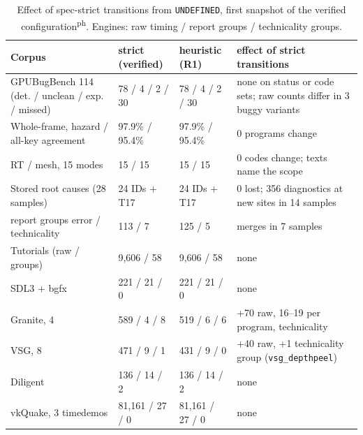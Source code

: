 \documentclass[acmtog,anonymous,review]{acmart}
\newcommand{\bench}{GPUBugBench\xspace}
\newcommand{\code}[1]{\texttt{#1}}
\newcommand{\posthoc}{\textsuperscript{\textsf{ph}}}
\begin{document}
\begin{table}[t]
\caption{Effect of spec-strict transitions from \code{UNDEFINED}, first snapshot of the verified configuration\posthoc.
Engines: raw timing / report groups / technicality groups.}
\label{tab:s-undef}
\small
\begin{tabular}{@{}p{}p{}p{}p{}@{}}
\toprule
Corpus & strict (verified) & heuristic (R1) & effect of strict transitions \\
\midrule
\bench 114 (det. / unclean / exp. / missed) & 78 / 4 / 2 / 30 & 78 / 4 / 2 / 30 & none on status or code sets; raw counts differ in 3 buggy variants \\
Whole-frame, hazard / all-key agreement & 97.9\% / 95.4\% & 97.9\% / 95.4\% & 0 programs change \\
RT / mesh, 15 modes & 15 / 15 & 15 / 15 & 0 codes change; texts name the scope \\
Stored root causes (28 samples) & 24 IDs + T17 & 24 IDs + T17 & 0 lost; 356 diagnostics at new sites in 14 samples \\
\quad report groups error / technicality & 113 / 7 & 125 / 5 & merges in 7 samples \\
Tutorials (raw / groups) & 9,606 / 58 & 9,606 / 58 & none \\
SDL3 + bgfx & 221 / 21 / 0 & 221 / 21 / 0 & none \\
Granite, 4 & 589 / 4 / 8 & 519 / 6 / 6 & +70 raw, 16--19 per program, technicality \\
VSG, 8 & 471 / 9 / 1 & 431 / 9 / 0 & +40 raw, +1 technicality group (\code{vsg\_depthpeel}) \\
Diligent & 136 / 14 / 2 & 136 / 14 / 2 & none \\
vkQuake, 3 timedemos & 81,161 / 27 / 0 & 81,161 / 27 / 0 & none \\
\bottomrule
\end{tabular}
\end{table}
\end{document}
